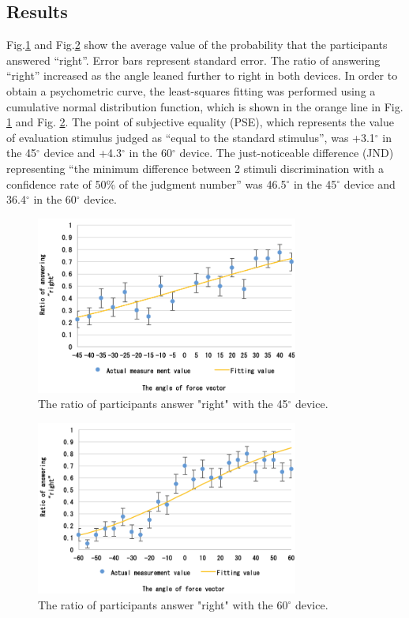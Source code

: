 \subsection{Results}

Fig.\ref{fig_jnd_45} and Fig.\ref{fig_jnd_60} show the average value of the probability that the participants answered “right”. 
Error bars represent standard error. 
The ratio of answering “right” increased as the angle leaned further to right in both devices. 
In order to obtain a psychometric curve, the least-squares fitting was performed using a cumulative normal distribution function, which is shown in the orange line in Fig. \ref{fig_jnd_45} and Fig. \ref{fig_jnd_60}.
The point of subjective equality (PSE), which represents the value of evaluation stimulus judged as “equal to the standard stimulus”, was +3.1$^{\circ}$ in the 45$^{\circ}$ device and +4.3$^{\circ}$ in the 60$^{\circ}$ device. 
The just-noticeable difference (JND) representing “the minimum difference between 2 stimuli discrimination with a confidence rate of 50\% of the judgment number” was 46.5$^{\circ}$ in the 45$^{\circ}$ device and 36.4$^{\circ}$ in the 60$^{\circ}$ device.

\begin{figure}[h]
  \centering
  \includegraphics[width=3.4in]{images/fig_jnd_45.png}
  \caption{The ratio of participants answer "right" with the 45$^{\circ}$ device.}
  \label{fig_jnd_45}
\end{figure}

\begin{figure}[h]
  \centering
  \includegraphics[width=3.4in]{images/fig_jnd_60.png}
  \caption{The ratio of participants answer "right" with the 60$^{\circ}$ device.}
  \label{fig_jnd_60}
\end{figure}

